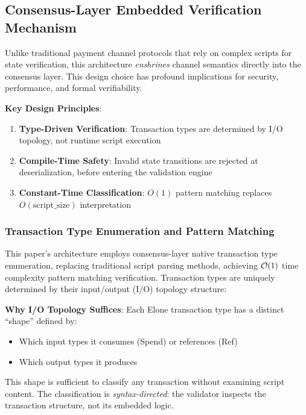 \subsection{Consensus-Layer Embedded Verification Mechanism}
\label{sec:tx-types}

Unlike traditional payment channel protocols that rely on complex scripts for state verification, this architecture \textit{enshrines} channel semantics directly into the consensus layer. This design choice has profound implications for security, performance, and formal verifiability.

\textbf{Key Design Principles}:
\begin{enumerate}
    \item \textbf{Type-Driven Verification}: Transaction types are determined by I/O topology, not runtime script execution
    \item \textbf{Compile-Time Safety}: Invalid state transitions are rejected at deserialization, before entering the validation engine
    \item \textbf{Constant-Time Classification}: $O(1)$ pattern matching replaces $O(\text{script\_size})$ interpretation
\end{enumerate}

\subsubsection{Transaction Type Enumeration and Pattern Matching}

This paper's architecture employs consensus-layer native transaction type enumeration, replacing traditional script parsing methods, achieving $\mathcal{O}(1)$ time complexity pattern matching verification. Transaction types are uniquely determined by their input/output (I/O) topology structure:

\textbf{Why I/O Topology Suffices}:
Each Elone transaction type has a distinct ``shape'' defined by:
\begin{itemize}
    \item Which input types it consumes (Spend) or references (Ref)
    \item Which output types it produces
\end{itemize}
This shape is sufficient to classify any transaction without examining script content. The classification is \textit{syntax-directed}: the validator inspects the transaction structure, not its embedded logic.

